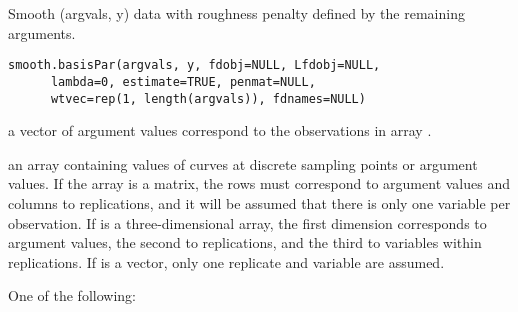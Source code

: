 \begin{Description}\relax
Smooth (argvals, y) data with roughness penalty defined by the
remaining arguments.
\end{Description}
\begin{Usage}
\begin{verbatim}
smooth.basisPar(argvals, y, fdobj=NULL, Lfdobj=NULL,
      lambda=0, estimate=TRUE, penmat=NULL,
      wtvec=rep(1, length(argvals)), fdnames=NULL)
\end{verbatim}
\end{Usage}
\begin{Arguments}
\begin{ldescription}
\item[\code{argvals}] a vector of argument values correspond to the observations in array
.

\item[\code{y}] an array containing values of curves at discrete sampling points or
argument values. If the array is a matrix, the rows must correspond
to argument values and columns to replications, and it will be
assumed that there is only one variable per observation.  If
 is a three-dimensional array, the first dimension
corresponds to argument values, the second to replications, and the
third to variables within replications.  If  is a vector,
only one replicate and variable are assumed.  

\item[\code{fdobj}] One of the following:

\end{ldescription}
\end{Arguments}
